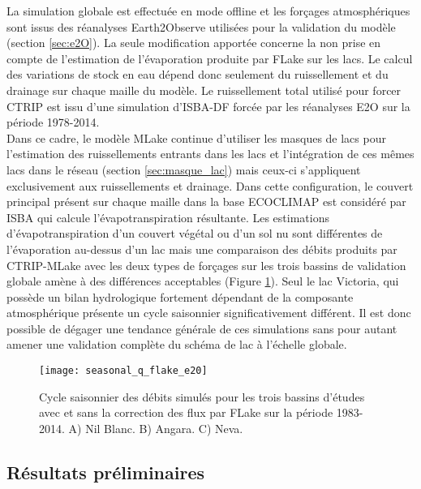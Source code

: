 La simulation globale est effectuée en mode offline et les forçages atmosphériques sont issus des réanalyses Earth2Observe utilisées pour la validation du modèle (section \ref{sec:e2O}). La seule modification apportée concerne la non prise en compte de l'estimation de l'évaporation produite par FLake sur les lacs. Le calcul des variations de stock en eau dépend donc seulement du ruissellement et du drainage sur chaque maille du modèle. Le ruissellement total utilisé pour forcer CTRIP est issu d'une simulation d'ISBA-DF forcée par les réanalyses E2O sur la période 1978-2014.\\ 
Dans ce cadre, le modèle MLake continue d'utiliser les masques de lacs pour l'estimation des ruissellements entrants dans les lacs et l'intégration de ces mêmes lacs dans le réseau (section \ref{sec:masque_lac}) mais ceux-ci s'appliquent exclusivement aux ruissellements et drainage. Dans cette configuration, le couvert principal présent sur chaque maille dans la base ECOCLIMAP est considéré par ISBA qui calcule l'évapotranspiration résultante. Les estimations d'évapotranspiration d'un couvert végétal ou d'un sol nu sont différentes de l'évaporation au-dessus d'un lac mais une comparaison des débits produits par CTRIP-MLake avec les deux types de forçages sur les trois bassins de validation globale amène à des différences acceptables (Figure \ref{seasonal_flake_e20}). Seul le lac Victoria, qui possède un bilan hydrologique fortement dépendant de la composante atmosphérique présente un cycle saisonnier significativement différent. Il est donc possible de dégager une tendance générale de ces simulations sans pour autant amener une validation complète du schéma de lac à l'échelle globale.

\begin{figure}[h!]
\centering
\texttt{[image: seasonal\_q\_flake\_e20]}
\caption{Cycle saisonnier des débits simulés pour les trois bassins d'études avec et sans la correction des flux par FLake sur la période 1983-2014. A) Nil Blanc. B) Angara. C) Neva.}
\label{seasonal_flake_e20}
\end{figure}
\clearpage
\subsection{{\selectfont Résultats préliminaires}}

